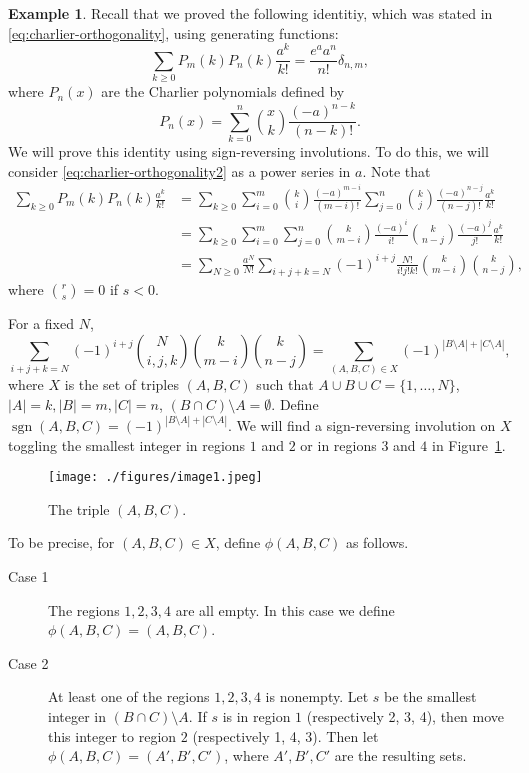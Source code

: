 \documentclass{amsart}
\numberwithin{equation}{section}
\theoremstyle{definition}
\newtheorem{exam}[thm]{Example}
\newcommand\sgn{\operatorname{sgn}}
\begin{document}
\begin{exam}
  Recall that we proved the following identitiy, which was stated in
  \eqref{eq:charlier-orthogonality}, using generating functions:
  \begin{equation}\label{eq:charlier-orthogonality2}
  \sum_{k\ge 0}  P_m(k) P_n(k) \frac{a^k}{k!} = \frac{e^a a^n}{n!} \delta_{n,m},
  \end{equation}
  where \( P_n(x) \) are the Charlier polynomials defined by
  \[
    P_n(x) = \sum_{k=0}^{n} \binom{x}{k} \frac{(-a)^{n-k}}{(n-k)!}.
  \]
  We will prove this identity using sign-reversing involutions. To do
  this, we will consider \eqref{eq:charlier-orthogonality2} as a power
  series in \( a \). Note that
\begin{align*}
  \sum_{k\ge 0}  P_m(k) P_n(k) \frac{a^k}{k!}
  &=  \sum_{k\ge 0} \sum_{i=0}^m \binom{k}{i} \frac{(-a)^{m-i}}{(m-i)!}
  \sum_{j=0}^n \binom{k}{j} \frac{(-a)^{n-j}}{(n-j)!} \frac{a^k}{k!}\\
  &=  \sum_{k\ge 0} \sum_{i=0}^m \sum_{j=0}^n
    \binom{k}{m-i} \frac{(-a)^{i}}{i!}
   \binom{k}{n-j} \frac{(-a)^{j}}{j!} \frac{a^k}{k!}\\
  &= \sum_{N\ge0} \frac{a^N}{N!} \sum_{i+j+k=N}
  (-1)^{i+j} \frac{N!}{i!j!k!} \binom{k}{m-i} \binom{k}{n-j},
\end{align*}
where \( \binom{r}{s}=0 \) if \( s<0 \).

For a fixed \( N \),
\[
  \sum_{i+j+k=N} (-1)^{i+j} \binom{N}{i,j,k} \binom{k}{m-i} \binom{k}{n-j}
  = \sum_{(A,B,C)\in X} (-1)^{|B\setminus A| + |C\setminus A|},
\]
where \( X \) is the set of triples \( (A,B,C) \) such that
\( A\cup B\cup C = \{ 1,\dots,N \} \), \( |A|=k, |B|=m, |C|=n \),
\( (B\cap C)\setminus A = \emptyset \). Define
\( \sgn(A,B,C) = (-1)^{|B\setminus A| + |C\setminus A|} \). We will
find a sign-reversing involution on \( X \) toggling the smallest
integer in regions \( 1 \) and \( 2 \) or in regions \( 3 \) and
\( 4 \) in Figure~\ref{fig:image1}.
\begin{figure}
  \centering
  \texttt{[image: ./figures/image1.jpeg]}
  \caption{The triple \( (A,B,C) \).}
  \label{fig:image1}
\end{figure}

To be precise, for \( (A,B,C)\in X \), define \( \phi(A,B,C) \) as
follows.
\begin{description}
\item[Case 1] The regions \( 1,2,3,4 \) are all empty. In this case we define
  \( \phi(A,B,C) = (A,B,C) \).
\item[Case 2] At least one of the regions \( 1,2,3,4 \) is nonempty.
  Let \( s \) be the smallest integer in \( (B\cap C) \setminus A \).
  If \( s \) is in region \( 1 \) (respectively 2, 3, 4), then move
  this integer to region \( 2 \) (respectively 1, 4, 3). Then let
  \( \phi(A,B,C) = (A',B',C') \), where \( A',B',C' \) are the
  resulting sets.
\end{description}


\end{exam}
\end{document}
